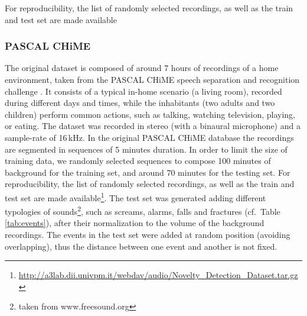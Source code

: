 For reproducibility, the list of randomly selected recordings, as well as the train and test set are made available %




\subsubsection{PASCAL CHiME}
\label{subsec:pascal}

The original dataset is composed of around 7 hours of recordings of a home environment, taken from the PASCAL CHiME speech separation and recognition challenge \cite{barker2013pascal}. 
It consists of a typical in-home scenario (a living room), recorded during different days and times,
while the inhabitants (two adults and two children) perform common actions, such as talking, watching television, playing, or eating. The dataset was recorded in stereo (with a binaural microphone) and a sample-rate of 16\,kHz. In the original PASCAL CHiME database the recordings are segmented in sequences of 5 minutes duration. In order to limit the size of training data, we randomly selected sequences to compose 100 minutes of background for the training set, and around 70 minutes for the testing set. For reproducibility, the list of randomly selected recordings, as well as the train and test set are made available\footnote{\url{http://a3lab.dii.univpm.it/webdav/audio/Novelty_Detection_Dataset.tar.gz}}. 
The test set was generated adding different typologies of sounds\footnote{taken from www.freesound.org}, such as screams, alarms, falls and fractures (cf.\ Table \ref{tab:events}), after their normalization to the volume of the background recordings. %
The events in the test set were added at random position (avoiding overlapping), thus the distance between one event and another is not fixed. %





